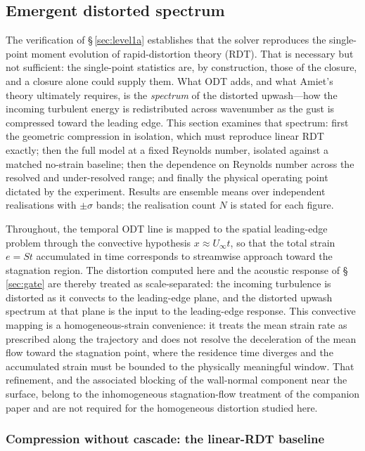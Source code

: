 \documentclass[lineno]{JFM-FLM_Au}
\begin{document}
\subsection{Emergent distorted spectrum}\label{sec:val-spectrum}

The verification of \S\,\ref{sec:level1a} establishes that the solver
reproduces the single-point moment evolution of rapid-distortion theory (RDT).
That is necessary but not sufficient: the single-point statistics are, by
construction, those of the closure, and a closure alone could supply them.
What ODT adds, and what Amiet's theory ultimately requires, is the
\emph{spectrum} of the distorted upwash---how the incoming turbulent energy is
redistributed across wavenumber as the gust is compressed toward the leading
edge. This section examines that spectrum: first the geometric compression in
isolation, which must reproduce linear RDT exactly; then the full model at a
fixed Reynolds number, isolated against a matched no-strain baseline; then the
dependence on Reynolds number across the resolved and under-resolved range; and
finally the physical operating point dictated by the experiment. Results are
ensemble means over independent realisations with $\pm\sigma$ bands; the
realisation count $N$ is stated for each figure.

Throughout, the temporal ODT line is mapped to the spatial leading-edge
problem through the convective hypothesis $x\approx U_\infty t$, so that the
total strain $e=St$ accumulated in time corresponds to streamwise approach
toward the stagnation region. The distortion computed here and the acoustic
response of \S\,\ref{sec:gate} are thereby treated as scale-separated: the
incoming turbulence is distorted as it convects to the leading-edge plane, and
the distorted upwash spectrum at that plane is the input to the leading-edge
response. This convective mapping is a homogeneous-strain convenience: it treats
the mean strain rate as prescribed along the trajectory and does not resolve the
deceleration of the mean flow toward the stagnation point, where the residence
time diverges and the accumulated strain must be bounded to the physically
meaningful window. That refinement, and the associated blocking of the
wall-normal component near the surface, belong to the inhomogeneous
stagnation-flow treatment of the companion paper and are not required for the
homogeneous distortion studied here.

\subsubsection{Compression without cascade: the linear-RDT
baseline}\label{sec:spec-rdt}
\end{document}
